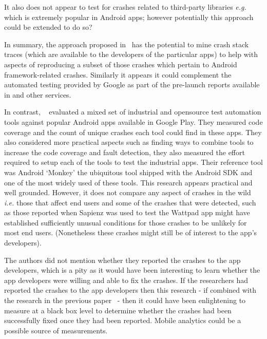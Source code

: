 It also does not appear to test for crashes related to third-party libraries \emph{e.g.}  which is extremely popular in Android apps; however potentially this approach could be extended to do so?

\afterpage{\clearpage}

In summary, the approach proposed in~ has the potential to mine crash stack traces (which are available to the developers of the particular apps) to help with aspects of reproducing a subset of those crashes which pertain to Android framework-related crashes. Similarly it appears it could complement the automated testing provided by Google as part of the pre-launch reports available in  and other services. 

In contrast, ~ evaluated a mixed set of industrial and opensource test automation tools against popular Android apps available in Google Play. They measured code coverage and the count of unique crashes each tool could find in these apps. They also considered more practical aspects such as finding ways to combine tools to increase the code coverage and fault detection, they also measured the effort required to setup each of the tools to test the industrial apps. Their reference tool was Android `Monkey' the ubiquitous tool shipped with the Android SDK and one of the most widely used of these tools. This research appears practical and well grounded. However, it does not compare any aspect of crashes in the wild \emph{i.e.} those that affect end users and some of the crashes that were detected, such as those reported when Sapienz was used to test the Wattpad app might have established sufficiently unusual conditions for those crashes to be unlikely for most end users. (Nonetheless these crashes might still be of interest to the app's developers). 

The authors did not mention whether they reported the crashes to the app developers, which is a pity as it would have been interesting to learn whether the app developers were willing and able to fix the crashes. If the researchers had reported the crashes to the app developers then this research - if combined with the research in the previous paper~ - then it could have been enlightening to measure at a black box level to determine whether the crashes had been successfully fixed once they had been reported. Mobile analytics could be a possible source of measurements.


